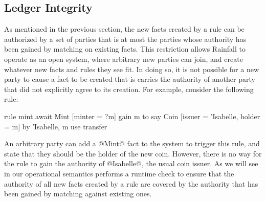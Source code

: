 \subsection{Ledger Integrity}
As mentioned in the previous section, the new facts created by a rule can be authorized by a set of parties that is at most the parties whose authority has been gained by matching on existing facts. This restriction allows Rainfall to operate as an open system, where arbitrary new parties can join, and create whatever new facts and rules they see fit. In doing so, it is not possible for a new party to cause a fact to be created that is carries the authority of another party that did not explicitly agree to its creation. For example, consider the following rule:

\begin{small}
\begin{code}
  rule  mint
  await Mint [minter = ?m] gain m
   to   say Coin [issuer = 'Isabelle, holder = m]
         by {'Isabelle, m} use {transfer}
\end{code}
\end{small}

An arbitrary party can add a @Mint@ fact to the system to trigger this rule, and state that they should be the holder of the new coin. However, there is no way for the rule to gain the authority of @Isabelle@, the usual coin issuer. As we will see in \REF our operational semantics performs a runtime check to ensure that the authority of all new facts created by a rule are covered by the authority that has been gained by matching against existing ones.

